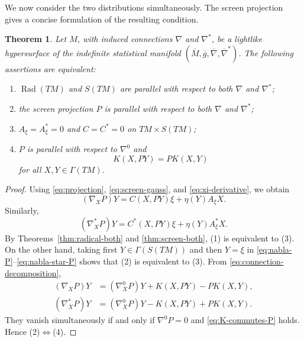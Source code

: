 \documentclass[10pt,a4paper]{amsart}
\newtheorem{theorem}{Theorem}[section]
\newcommand{\Rad}{\operatorname{Rad}}
\begin{document}
We now consider the two distributions simultaneously. The screen
projection gives a concise formulation of the resulting condition.

\begin{theorem}\label{thm:both-distributions}
Let $M$, with induced connections $\nabla$ and $\nabla^{*}$, be a lightlike
hypersurface of the indefinite statistical manifold
$(\overline{M},\overline{g},\overline{\nabla},\overline{\nabla}^{*})$.
The following assertions are equivalent:
\begin{enumerate}
\item $\Rad(TM)$ and $S(TM)$ are parallel with respect to both
$\nabla$ and $\nabla^{*}$;
\item the screen projection $P$ is parallel with respect to both
$\nabla$ and $\nabla^{*}$;
\item $A_{\xi}=A_{\xi}^{*}=0$ and $C=C^{*}=0$ on
$TM\times S(TM)$;
\item $P$ is parallel with respect to $\nabla^{0}$ and
\begin{equation}\label{eq:K-commutes-P}
K(X,PY)=P K(X,Y)
\end{equation}
for all $X,Y\in\Gamma(TM)$.
\end{enumerate}
\end{theorem}

\begin{proof}
Using \eqref{eq:projection}, \eqref{eq:screen-gauss}, and
\eqref{eq:xi-derivative}, we obtain
\begin{equation}\label{eq:nabla-P}
(\nabla_XP)Y=C(X,PY)\xi+\eta(Y)A_{\xi}X.
\end{equation}
Similarly,
\begin{equation}\label{eq:nabla-star-P}
(\nabla_X^{*}P)Y=C^{*}(X,PY)\xi+\eta(Y)A_{\xi}^{*}X.
\end{equation}
By Theorems~\ref{thm:radical-both} and \ref{thm:screen-both},
(1) is equivalent to (3). On the other hand, taking first
$Y\in\Gamma(S(TM))$ and then $Y=\xi$ in
\eqref{eq:nabla-P}--\eqref{eq:nabla-star-P} shows that (2) is
equivalent to (3). From \eqref{eq:connection-decomposition},
\begin{align*}
(\nabla_XP)Y
&=(\nabla_X^{0}P)Y+K(X,PY)-P K(X,Y),\\
(\nabla_X^{*}P)Y
&=(\nabla_X^{0}P)Y-K(X,PY)+P K(X,Y).
\end{align*}
They vanish simultaneously if and only if $\nabla^{0}P=0$ and
\eqref{eq:K-commutes-P} holds. Hence (2)$\Leftrightarrow$(4).
\end{proof}
\end{document}
